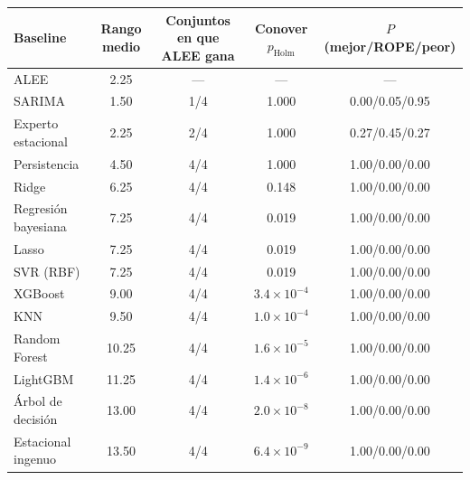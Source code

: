 \begin{tabular}{lcccc}
\toprule
Baseline & Rango medio & Conjuntos en que ALEE gana & Conover $p_{\mathrm{Holm}}$ & $P$(mejor/ROPE/peor) \\
\midrule
ALEE & 2.25 & --- & --- & --- \\
\midrule
SARIMA & 1.50 & 1/4 & 1.000 & 0.00/0.05/0.95 \\
Experto estacional & 2.25 & 2/4 & 1.000 & 0.27/0.45/0.27 \\
Persistencia & 4.50 & 4/4 & 1.000 & 1.00/0.00/0.00 \\
Ridge & 6.25 & 4/4 & 0.148 & 1.00/0.00/0.00 \\
Regresión bayesiana & 7.25 & 4/4 & 0.019 & 1.00/0.00/0.00 \\
Lasso & 7.25 & 4/4 & 0.019 & 1.00/0.00/0.00 \\
SVR (RBF) & 7.25 & 4/4 & 0.019 & 1.00/0.00/0.00 \\
XGBoost & 9.00 & 4/4 & $3.4\times10^{-4}$ & 1.00/0.00/0.00 \\
KNN & 9.50 & 4/4 & $1.0\times10^{-4}$ & 1.00/0.00/0.00 \\
Random Forest & 10.25 & 4/4 & $1.6\times10^{-5}$ & 1.00/0.00/0.00 \\
LightGBM & 11.25 & 4/4 & $1.4\times10^{-6}$ & 1.00/0.00/0.00 \\
Árbol de decisión & 13.00 & 4/4 & $2.0\times10^{-8}$ & 1.00/0.00/0.00 \\
Estacional ingenuo & 13.50 & 4/4 & $6.4\times10^{-9}$ & 1.00/0.00/0.00 \\
\bottomrule
\end{tabular}